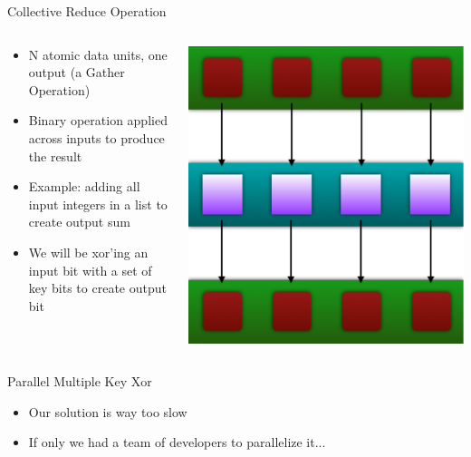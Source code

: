 \documentclass[xcolor=dvipsnames]{beamer}
\begin{document}
  \begin{frame}{Collective Reduce Operation}
		\begin{columns}
			\begin{column}{0.5\textwidth}
				\begin{itemize}
					\item N atomic data units, one output (a Gather Operation)
					\item Binary operation applied across inputs to produce the result
					\item Example: adding all input integers in a list to create output sum
          \item We will be xor'ing an input bit with a set of key bits to create output bit
				\end{itemize}
			\end{column}
			\begin{column}{0.5\textwidth}
				\includegraphics[width=\textwidth]{images/mapPattern}
			\end{column}
		\end{columns}
	\end{frame}
	
	
	\begin{frame}{Parallel Multiple Key Xor}
		\begin{itemize}
			\item Our solution is way too slow
			\item If only we had a team of developers to parallelize it...
		\end{itemize}
	\end{frame}
	
\end{document}
